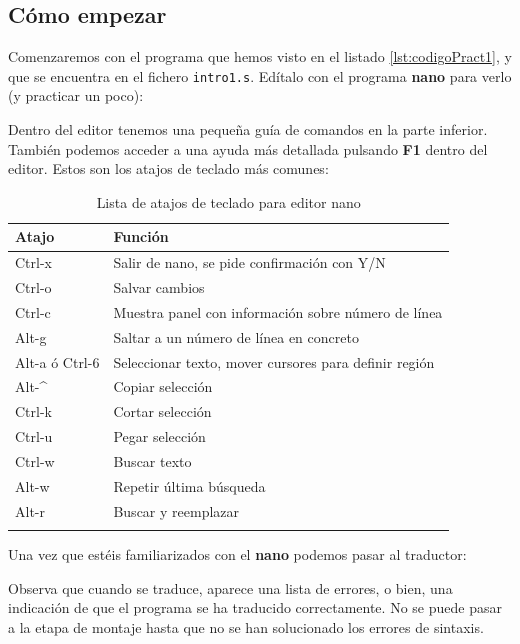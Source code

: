 \subsection{Cómo empezar}

Comenzaremos con el programa que hemos visto en el listado
\ref{lst:codigoPract1}, y que se encuentra en el fichero {\tt intro1.s}.
Edítalo con el programa {\bf nano} para verlo (y practicar un poco):

\hspace{2.5cm}{\bf nano intro1.s}

Dentro del editor tenemos una pequeña guía de comandos en la parte
inferior. También podemos acceder a una ayuda más detallada pulsando {\bf F1}
dentro del editor. Estos son los atajos de teclado más comunes:

\begin{longtable}{| p{1.3cm} | p{12cm} |}
\hline
{\bf Atajo} & {\bf Función} \\ \hline
Ctrl-x & Salir de nano, se pide confirmación con Y/N \\ \hline
Ctrl-o & Salvar cambios \\ \hline
Ctrl-c & Muestra panel con información sobre número de línea \\ \hline
Alt-g  & Saltar a un número de línea en concreto \\ \hline
Alt-a ó\newline
Ctrl-6 & Seleccionar texto, mover cursores para definir región  \\ \hline
Alt-\^ & Copiar selección \\ \hline
Ctrl-k & Cortar selección \\ \hline
Ctrl-u & Pegar selección \\ \hline
Ctrl-w & Buscar texto \\ \hline
Alt-w  & Repetir última búsqueda \\ \hline
Alt-r  & Buscar y reemplazar \\ \hline
\caption{Lista de atajos de teclado para editor nano}
\label{list_nano}
\end{longtable}

Una vez que estéis familiarizados con el {\bf nano} podemos pasar al
traductor:

\hspace{2.5cm}{\bf as -o intro1.o intro1.s}

Observa que cuando se traduce, aparece una lista de errores, o bien, una
indicación de que el programa se ha traducido correctamente.
No se puede pasar a la etapa de montaje hasta que no se han solucionado
los errores de sintaxis.

